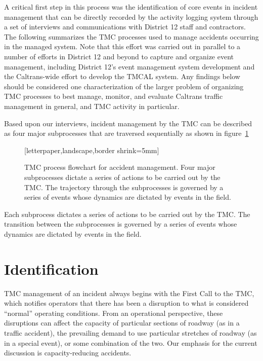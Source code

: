 \documentclass[12pt]{report}
\begin{document}
A critical first step in this process was the identification of core events in
incident management that can be directly recorded by the activity logging system
through a set of interviews and communications with District 12 staff and
contractors.  The following summarizes the \ac{TMC} processes used to manage
accidents occurring in the managed system.  Note that this effort was carried
out in parallel to a number of efforts in District 12 and beyond to capture and
organize event management, including District 12's event management system
development and the Caltrans-wide effort to develop the \ac{TMCAL} system.  Any
findings below should be considered one characterization of the larger problem
of organizing \ac{TMC} processes to best manage, monitor, and evaluate Caltrans
traffic management in general, and \ac{TMC} activity in particular.

Based upon our interviews, incident management by the \ac{TMC} can be described
as four major subprocesses that are traversed sequentially as shown in
figure~\ref{fig:flowchart}
\begin{figure}
  [letterpaper,landscape,border shrink=5mm]
  \centering
  
  \caption[TMC process flowchart for accident management]{TMC process
    flowchart for accident management.  Four major subprocesses
    dictate a series of actions to be carried out by the TMC.  The
    trajectory through the subprocesses is governed by a series of
    events whose dynamics are dictated by events in the field.}
  \label{fig:flowchart}
\end{figure}
Each subprocess dictates a series of actions to be carried out by the \ac{TMC}.
The transition between the subprocesses is governed by a series of events whose
dynamics are dictated by events in the field.

\section{Identification}
\label{sec:identification}


\ac{TMC} management of an incident always begins with the {\sc First Call} to
the \ac{TMC}, which notifies operators that there has been a disruption to what
is considered ``normal'' operating conditions.  From an operational perspective,
these disruptions can affect the capacity of particular sections of roadway (as
in a traffic accident), the prevailing demand to use particular stretches of
roadway (as in a special event), or some combination of the two.  Our emphasis
for the current discussion is capacity-reducing accidents.
\end{document}
